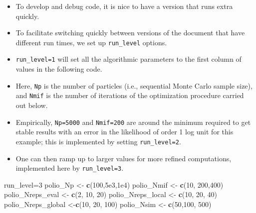 \documentclass[]{article}
\newenvironment{Shaded}{\begin{snugshade}}{\end{snugshade}}
\newcommand{\KeywordTok}[1]{\textcolor[rgb]{0.13,0.29,0.53}{\textbf{#1}}}
\newcommand{\DecValTok}[1]{\textcolor[rgb]{0.00,0.00,0.81}{#1}}
\newcommand{\FloatTok}[1]{\textcolor[rgb]{0.00,0.00,0.81}{#1}}
\newcommand{\StringTok}[1]{\textcolor[rgb]{0.31,0.60,0.02}{#1}}
\newcommand{\NormalTok}[1]{#1}
\begin{document}
\begin{itemize}
\item
  To develop and debug code, it is nice to have a version that runs
  extra quickly.
\item
  To facilitate switching quickly between versions of the document that
  have different run times, we set up \texttt{run\_level} options.
\item
  \texttt{run\_level=1} will set all the algorithmic parameters to the
  first column of values in the following code.
\item
  Here, \texttt{Np} is the number of particles (i.e., sequential Monte
  Carlo sample size), and \texttt{Nmif} is the number of iterations of
  the optimization procedure carried out below.
\item
  Empirically, \texttt{Np=5000} and \texttt{Nmif=200} are around the
  minimum required to get stable results with an error in the likelihood
  of order 1 log unit for this example; this is implemented by setting
  \texttt{run\_level=2}.
\item
  One can then ramp up to larger values for more refined computations,
  implemented here by \texttt{run\_level=3}.
\end{itemize}

\begin{Shaded}
\begin{Highlighting}[]
\NormalTok{run_level=}\DecValTok{3}
\NormalTok{polio_Np <-}\StringTok{          }\KeywordTok{c}\NormalTok{(}\DecValTok{100}\NormalTok{,}\FloatTok{5e3}\NormalTok{,}\FloatTok{1e4}\NormalTok{)}
\NormalTok{polio_Nmif <-}\StringTok{        }\KeywordTok{c}\NormalTok{(}\DecValTok{10}\NormalTok{, }\DecValTok{200}\NormalTok{,}\DecValTok{400}\NormalTok{)}
\NormalTok{polio_Nreps_eval <-}\StringTok{  }\KeywordTok{c}\NormalTok{(}\DecValTok{2}\NormalTok{,  }\DecValTok{10}\NormalTok{,  }\DecValTok{20}\NormalTok{)}
\NormalTok{polio_Nreps_local <-}\StringTok{ }\KeywordTok{c}\NormalTok{(}\DecValTok{10}\NormalTok{, }\DecValTok{20}\NormalTok{, }\DecValTok{40}\NormalTok{)}
\NormalTok{polio_Nreps_global <-}\KeywordTok{c}\NormalTok{(}\DecValTok{10}\NormalTok{, }\DecValTok{20}\NormalTok{, }\DecValTok{100}\NormalTok{)}
\NormalTok{polio_Nsim <-}\StringTok{        }\KeywordTok{c}\NormalTok{(}\DecValTok{50}\NormalTok{,}\DecValTok{100}\NormalTok{, }\DecValTok{500}\NormalTok{) }
\end{Highlighting}
\end{Shaded}
\end{document}
